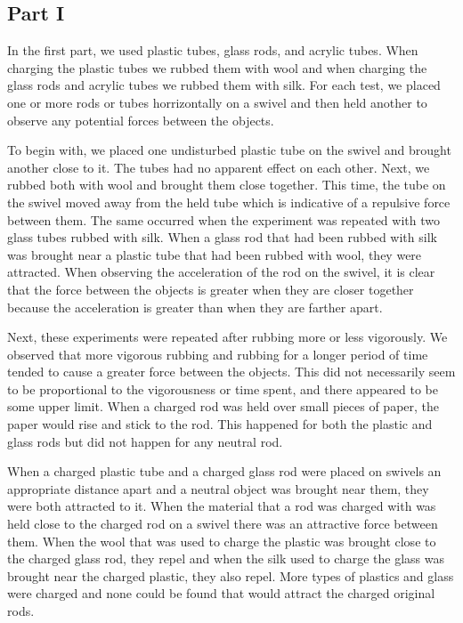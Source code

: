 \documentclass[12pt]{article}
\begin{document}
    \subsection{Part I}
        In the first part, we used plastic tubes, glass rods, and acrylic tubes. When charging the plastic tubes we rubbed them with wool and when charging the glass rods and acrylic tubes we rubbed them with silk. For each test, we placed one or more rods or tubes horrizontally on a swivel and then held another to observe any potential forces between the objects.

        To begin with, we placed one undisturbed plastic tube on the swivel and brought another close to it. The tubes had no apparent effect on each other. Next, we rubbed both with wool and brought them close together. This time, the tube on the swivel moved away from the held tube which is indicative of a repulsive force between them. The same occurred when the experiment was repeated with two glass tubes rubbed with silk. When a glass rod that had been rubbed with silk was brought near a plastic tube that had been rubbed with wool, they were attracted. When observing the acceleration of the rod on the swivel, it is clear that the force between the objects is greater when they are closer together because the acceleration is greater than when they are farther apart.

        Next, these experiments were repeated after rubbing more or less vigorously. We observed that more vigorous rubbing and rubbing for a longer period of time tended to cause a greater force between the objects. This did not necessarily seem to be proportional to the vigorousness or time spent, and there appeared to be some upper limit. When a charged rod was held over small pieces of paper, the paper would rise and stick to the rod. This happened for both the plastic and glass rods but did not happen for any neutral rod.

        When a charged plastic tube and a charged glass rod were placed on swivels an appropriate distance apart and a neutral object was brought near them, they were both attracted to it. When the material that a rod was charged with was held close to the charged rod on a swivel there was an attractive force between them. When the wool that was used to charge the plastic was brought close to the charged glass rod, they repel and when the silk used to charge the glass was brought near the charged plastic, they also repel. More types of plastics and glass were charged and none could be found that would attract the charged original rods.
\end{document}
